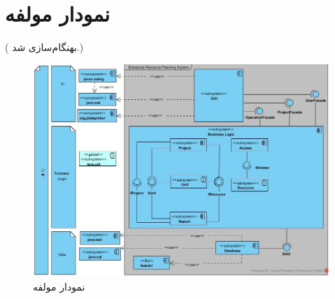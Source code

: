 
\chapter{نمودار مولفه}
\newpage
({\color{red} بهنگام‌سازی شد.})
\begin{figure}[H]
	\centering
	\includegraphics[scale=0.65]{img/comp/ComponentDiagram}
	\caption{نمودار مولفه}
\end{figure}



